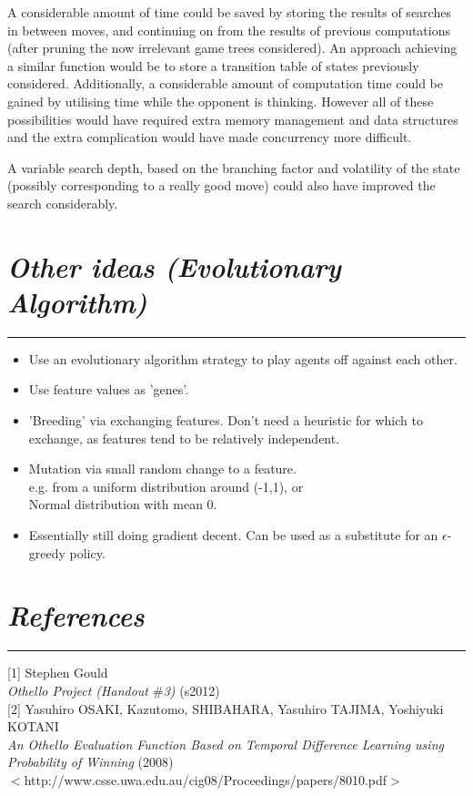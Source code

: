 \documentclass[10pt]{report}
\begin{document}
\begin{multicols}{2}
A considerable amount of time could be saved by storing the results of searches in between moves, and continuing on from the results of previous computations (after pruning the now irrelevant game trees considered). An approach achieving a similar function would be to store a transition table of states previously considered. Additionally, a considerable amount of computation time could be gained by utilising time while the opponent is thinking. However all of these possibilities would have required extra memory management and data structures and the extra complication would have made concurrency more difficult.

A variable search depth, based on the branching factor and volatility of the state (possibly corresponding to a really good move) could also have improved the search considerably.
\section*{\emph{Other ideas (Evolutionary Algorithm)}}
\hrule
    \begin{itemize}
  \item
   	Use an evolutionary algorithm strategy to play agents off against each other.
  \item
	Use feature values as 'genes'.
  \item
	'Breeding' via exchanging features. Don't need a heuristic for which to exchange, as features tend to be relatively independent.
  \item
	Mutation via small random change to a feature.
	\\ e.g. from a uniform distribution around (-1,1), or
	\\ Normal distribution with mean 0.
  \item
	Essentially still doing gradient decent. Can be used as a substitute for an $\epsilon$-greedy policy.
  \end{itemize}
  
\section*{\emph{References}}
\hrule

[1]
Stephen Gould\\
\emph{Othello Project (Handout $\#$3)} (s2012)\\
  
[2] Yasuhiro OSAKI, Kazutomo, SHIBAHARA, Yasuhiro TAJIMA, Yoshiyuki KOTANI\\
\emph{An Othello Evaluation Function Based on Temporal Difference Learning using Probability of Winning} (2008)\\
$<$http://www.csse.uwa.edu.au/cig08/Proceedings/papers/8010.pdf$>$


\end{multicols}
\end{document}
